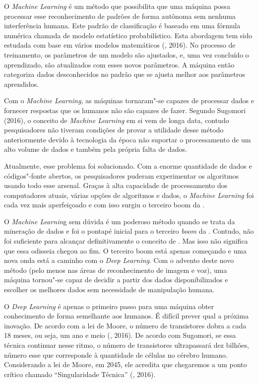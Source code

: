 O \emph{Machine Learning} é um método que possibilita que uma máquina
possa processar esse reconhecimento de padrões de forma autônoma sem
nenhuma interferência humana. Este padrão de classificação é baseado em
uma fórmula numérica chamada de modelo estatístico probabilístico. Esta
abordagem tem sido estudada com base em vários modelos matemáticos
(, 2016). No processo de treinamento, os parâmetros de um modelo
são ajustados, e, uma vez concluído o aprendizado, são atualizados com
esses novos parâmetros. A máquina então categoriza dados desconhecidos
no padrão que se ajusta melhor aos parâmetros aprendidos.

Com o \emph{Machine Learning,} as máquinas tornaram"-se capazes de
processar dados e fornecer respostas que os humanos não são capazes de
fazer. Segundo Sugomori (2016), o conceito de \emph{Machine Learning} em
si vem de longa data, contudo pesquisadores não tiveram condições de
provar a utilidade desse método anteriormente devido à tecnologia da
época não suportar o processamento de um alto volume de dados e também
pela própria falta de dados.

Atualmente, esse problema foi solucionado. Com a enorme quantidade de
dados e códigos"-fonte abertos, os pesquisadores puderam experimentar os
algoritmos usando todo esse arsenal. Graças à alta capacidade de
processamento dos computadores atuais, várias opções de algoritmos e
dados, o \emph{Machine Learning} foi cada vez mais aperfeiçoado e com
isso surgiu o terceiro boom da .

O \emph{Machine Learnin}g sem dúvida é um poderoso método quando se
trata da mineração de dados e foi o pontapé inicial para o terceiro
\emph{boom} da . Contudo, não foi suficiente para alcançar
definitivamente o conceito de . Mas isso não significa que essa
odisseia chegou ao fim. O terceiro boom está apenas começando e uma nova
onda está a caminho com o \emph{Deep Learning}. Com o advento deste novo
método (pelo menos nas áreas de reconhecimento de imagem e voz), uma
máquina tornou"-se capaz de decidir a partir dos dados disponibilizados e
escolher os melhores dados sem necessidade de manipulação humana.

O \emph{Deep Learning} é apenas o primeiro passo para uma máquina obter
conhecimento de forma semelhante aos humanos. É difícil prever qual a
próxima inovação. De acordo com a lei de Moore, o número de transistores
dobra a cada 18 meses, ou seja, um ano e meio (, 2016). De
acordo com Sugomori, se essa técnica continuar nesse ritmo, o número de
transistores ultrapassará dez bilhões, número esse que corresponde à
quantidade de células no cérebro humano. Considerando a lei de Moore, em
2045, ele acredita que chegaremos a um ponto crítico chamado
``Singularidade Técnica'' (, 2016).

